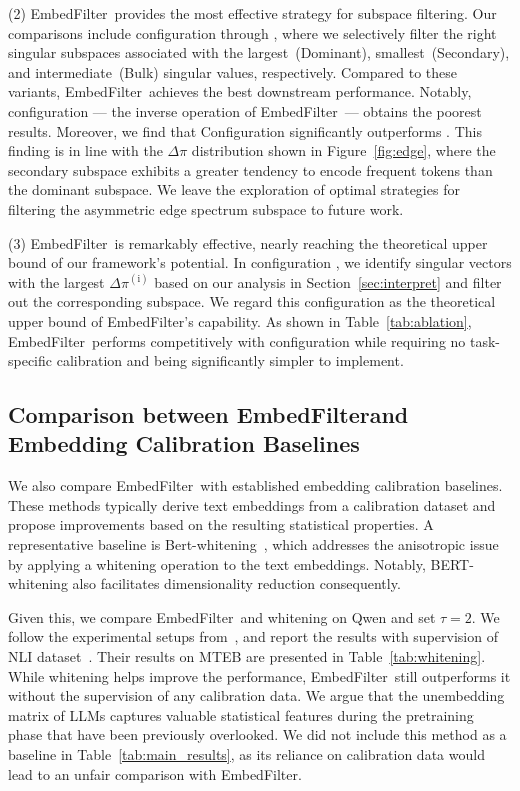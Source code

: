 \documentclass[sigconf]{acmart}
\newcommand{\name}{EmbedFilter}
\newcommand{\circledNum}[1]{%
  \tikz[baseline, anchor=base]{\node[draw,circle,inner sep=0.1pt, font=\fontsize{7.5}{10}\selectfont] {#1};}%
}
\begin{document}
(2) \name\ provides the most effective strategy for subspace filtering.
Our comparisons include configuration \circledNum{3} through \circledNum{5}, where we selectively filter the right singular subspaces associated with the largest~(Dominant), smallest~(Secondary), and  intermediate~(Bulk) singular values, respectively.
Compared to these variants, \name\ achieves the best downstream performance.
Notably, configuration \circledNum{5} --- the inverse operation of \name\ --- obtains the poorest results. 
Moreover, we find that Configuration \circledNum{4} significantly outperforms \circledNum{5}.
This finding is in line with the \(\Delta \pi\) distribution shown in Figure~\ref{fig:edge}, where the secondary subspace exhibits a greater tendency to encode frequent tokens than the dominant subspace. 
We leave the exploration of optimal strategies for filtering the asymmetric edge spectrum subspace to future work.

(3) \name\ is remarkably effective, nearly reaching the theoretical upper bound of our framework's potential. In configuration \circledNum{6}, we identify singular vectors with the largest $\Delta \pi^{\mathrm{(i)}}$ based on our analysis in Section~\ref{sec:interpret} and filter out the corresponding subspace. 
We regard this configuration as the theoretical upper bound of \name's capability. As shown in Table~\ref{tab:ablation}, \name\ performs competitively with configuration \circledNum{6} while requiring no task-specific calibration and being significantly simpler to implement.


\subsection{Comparison between \name and  Embedding Calibration Baselines}
We also compare \name\ with established embedding calibration baselines.
These methods typically derive text embeddings from a calibration dataset and propose improvements based on the resulting statistical properties.
A representative baseline is Bert-whitening~\cite{whitening}, which addresses the anisotropic issue by applying a whitening operation to the text embeddings.
Notably, BERT-whitening also facilitates dimensionality reduction consequently.

Given this, we compare \name~and whitening on Qwen and set \(\tau=2\).
We follow the experimental setups from~\cite{whitening}, and report the results with supervision of NLI dataset~\cite{allni}.
Their results on MTEB are presented in Table~\ref{tab:whitening}.
While whitening helps improve the performance, \name~still outperforms it without the supervision of any calibration data.
We argue that the unembedding matrix of LLMs captures valuable statistical features during the pretraining phase that have been previously overlooked.
We did not include this method as a baseline in Table~\ref{tab:main_results}, as its reliance on calibration data would lead to an unfair comparison with \name.
\end{document}

